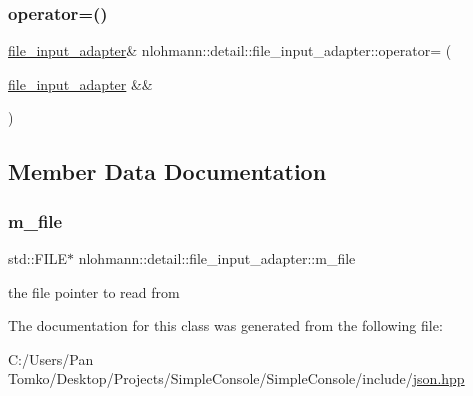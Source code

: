 \subsubsection{\texorpdfstring{operator=()}{operator=()}\hspace{0.1cm}{\footnotesize\ttfamily [2/2]}}
{\footnotesize\ttfamily \mbox{\hyperlink{classnlohmann_1_1detail_1_1file__input__adapter}{file\+\_\+input\+\_\+adapter}}\& nlohmann\+::detail\+::file\+\_\+input\+\_\+adapter\+::operator= (\begin{DoxyParamCaption}\item[{\mbox{\hyperlink{classnlohmann_1_1detail_1_1file__input__adapter}{file\+\_\+input\+\_\+adapter}} \&\&}]{ }\end{DoxyParamCaption})\hspace{0.3cm}{\ttfamily [default]}}



\subsection{Member Data Documentation}
\mbox{\label{classnlohmann_1_1detail_1_1file__input__adapter_a164fbe2739ac97e517e22bc1fff1c174}} 
\subsubsection{\texorpdfstring{m\_file}{m\_file}}
{\footnotesize\ttfamily std\+::\+F\+I\+LE$\ast$ nlohmann\+::detail\+::file\+\_\+input\+\_\+adapter\+::m\+\_\+file\hspace{0.3cm}{\ttfamily [private]}}



the file pointer to read from 



The documentation for this class was generated from the following file\+:\begin{DoxyCompactItemize}
\item 
C\+:/\+Users/\+Pan Tomko/\+Desktop/\+Projects/\+Simple\+Console/\+Simple\+Console/include/\mbox{\hyperlink{json_8hpp}{json.\+hpp}}\end{DoxyCompactItemize}
